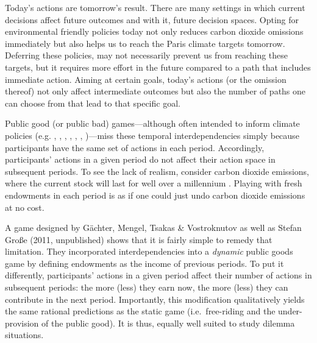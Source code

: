 \documentclass[
  authoryear,
  preprint,
  3p]{elsarticle}
\begin{document}
Today's actions are tomorrow's result. There are many settings in which
current decisions affect future outcomes and with it, future decision
spaces. Opting for environmental friendly policies today not only
reduces carbon dioxide omissions immediately but also helps us to reach
the Paris climate targets tomorrow. Deferring these policies, may not
necessarily prevent us from reaching these targets, but it requires more
effort in the future compared to a path that includes immediate action.
Aiming at certain goals, today's actions (or the omission thereof) not
only affect intermediate outcomes but also the number of paths one can
choose from that lead to that specific goal.

Public good (or public bad) games---although often intended to inform
climate policies (e.g. \citet{MilinskiEtAl2006}, \citet{TavoniEtAl2011},
\citet{Hauser2014}, \citet{BrickEtAl2015}, \citet{GomezEtAl2018},
\citet{CalzolariEtAl2018}, \citet{CookEtAl2019})---miss these temporal
interdependencies simply because participants have the same set of
actions in each period. Accordingly, participants' actions in a given
period do not affect their action space in subsequent periods. To see
the lack of realism, consider carbon dioxide emissions, where the
current stock will last for well over a millennium
\citep{Inman2008, CalzolariEtAl2018}. Playing with fresh endowments in
each period is as if one could just undo carbon dioxide emissions at no
cost.

A game designed by Gächter, Mengel, Tsakas \& Vostroknutov \citeyearpar[
hereafter, GMTV]{GMTV2017} as well as Stefan Große (2011, unpublished)
shows that it is fairly simple to remedy that limitation. They
incorporated interdependencies into a \emph{dynamic} public goods game
by defining endowments as the income of previous periods. To put it
differently, participants' actions in a given period affect their number
of actions in subsequent periods: the more (less) they earn now, the
more (less) they can contribute in the next period. Importantly, this
modification qualitatively yields the same rational predictions as the
static game (i.e.~free-riding and the under-provision of the public
good). It is thus, equally well suited to study dilemma situations.
\end{document}

